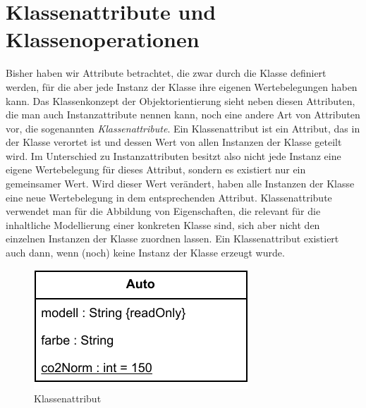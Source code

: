 \section{Klassenattribute und Klassenoperationen}
\label{sec:Kap-8.3}

Bisher haben wir Attribute betrachtet, die zwar durch die Klasse definiert werden, für die aber jede Instanz der Klasse ihre eigenen Wertebelegungen haben kann. Das Klassenkonzept der Objektorientierung sieht neben diesen Attributen, die man auch Instanzattribute nennen kann, noch eine andere Art von Attributen vor, die sogenannten \textit{Klassenattribute}. Ein Klassenattribut ist ein Attribut, das in der Klasse verortet ist und dessen Wert von allen Instanzen der Klasse geteilt wird. Im Unter\-schied zu Instanzattributen besitzt also nicht jede Instanz eine eigene Wertebelegung für dieses Attribut, sondern es existiert nur ein gemeinsamer Wert. Wird dieser Wert verändert, haben alle Instanzen der Klasse eine neue Wertebelegung in dem entsprechenden Attribut. Klassenattribute verwendet man für die Abbildung von Eigenschaften, die relevant für die inhaltliche Modellierung einer konkreten \mbox{Klasse} sind, sich aber nicht den einzelnen Instanzen der Klasse zuordnen lassen. Ein Klassen\-attribut existiert auch dann, wenn (noch) keine Instanz der Klasse erzeugt wurde. 

\vspace{\baselineskip} %
\vspace{2mm} %

\begin{figure}[h!]
	\centering
	\includegraphics[scale=1.0]{Bilder/Kapitel-8/klasse_auto_mit_klassenattribut.pdf}
	\caption{Klassenattribut}
	\label{fig:klasse_auto_mit_klassenattribut}
\end{figure}

\vspace{2mm} %

